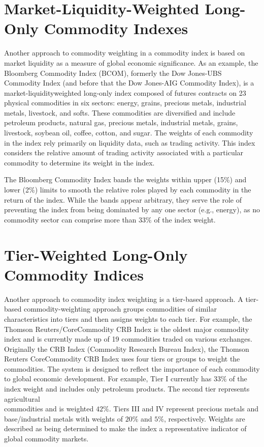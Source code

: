 \documentclass[11pt]{article}
\begin{document}
\section*{Market-Liquidity-Weighted Long-Only Commodity Indexes}
Another approach to commodity weighting in a commodity index is based on market liquidity as a measure of global economic significance. As an example, the Bloomberg Commodity Index (BCOM), formerly the Dow Jones-UBS Commodity Index (and before that the Dow Jones-AIG Commodity Index), is a market-liquidityweighted long-only index composed of futures contracts on 23 physical commodities in six sectors: energy, grains, precious metals, industrial metals, livestock, and softs. These commodities are diversified and include petroleum products, natural gas, precious metals, industrial metals, grains, livestock, soybean oil, coffee, cotton, and sugar. The weights of each commodity in the index rely primarily on liquidity data, such as trading activity. This index considers the relative amount of trading activity associated with a particular commodity to determine its weight in the index.

The Bloomberg Commodity Index bands the weights within upper (15\%) and lower (2\%) limits to smooth the relative roles played by each commodity in the return of the index. While the bands appear arbitrary, they serve the role of preventing the index from being dominated by any one sector (e.g., energy), as no commodity sector can comprise more than $33 \%$ of the index weight.

\section*{Tier-Weighted Long-Only Commodity Indices}
Another approach to commodity index weighting is a tier-based approach. A tier-based commodity-weighting approach groups commodities of similar characteristics into tiers and then assigns weights to each tier. For example, the Thomson Reuters/CoreCommodity CRB Index is the oldest major commodity index and is currently made up of 19 commodities traded on various exchanges. Originally the CRB Index (Commodity Research Bureau Index), the Thomson Reuters CoreCommodity CRB Index uses four tiers or groups to weight the commodities. The system is designed to reflect the importance of each commodity to global economic development. For example, Tier I currently has $33 \%$ of the index weight and includes only petroleum products. The second tier represents agricultural\\
commodities and is weighted $42 \%$. Tiers III and IV represent precious metals and base/industrial metals with weights of $20 \%$ and $5 \%$, respectively. Weights are described as being determined to make the index a representative indicator of global commodity markets.
\end{document}
